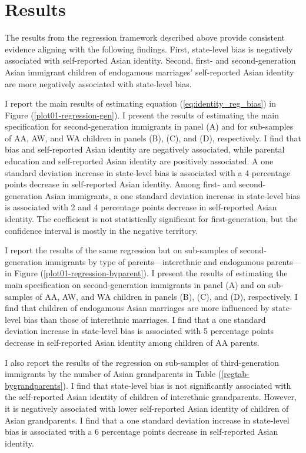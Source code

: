 \section{Results}\label{sec:results}
The results from the regression framework described above provide consistent evidence aligning with the following findings. First, state-level bias is negatively associated with self-reported Asian identity. Second, first- and second-generation Asian immigrant children of endogamous marriages' self-reported Asian identity are more negatively associated with state-level bias. 

I report the main results of estimating equation (\ref{eq:identity_reg_bias}) in Figure (\ref{plot01-regression-gen}). I present the results of estimating the main specification for second-generation immigrants in panel (A) and for sub-samples of AA, AW, and WA children in panels (B), (C), and (D), respectively. I find that bias and self-reported Asian identity are negatively associated, while parental education and self-reported Asian identity are positively associated. A one standard deviation increase in state-level bias is associated with a 4 percentage points decrease in self-reported Asian identity. Among first- and second-generation Asian immigrants, a one standard deviation increase in state-level bias is associated with 2 and 4 percentage points decrease in self-reported Asian identity. The coefficient is not statistically significant for first-generation, but the confidence interval is mostly in the negative territory.

I report the results of the same regression but on sub-samples of second-generation immigrants by type of parents---interethnic and endogamous parents---in Figure (\ref{plot01-regression-byparent}). I present the results of estimating the main specification on second-generation immigrants in panel (A) and on sub-samples of AA, AW, and WA children in panels (B), (C), and (D), respectively. I find that children of endogamous Asian marriages are more influenced by state-level bias than those of interethnic marriages. I find that a one standard deviation increase in state-level bias is associated with 5 percentage points decrease in self-reported Asian identity among children of AA parents. 

I also report the results of the regression on sub-samples of third-generation immigrants by the number of Asian grandparents in Table (\ref{regtab-bygrandparents}). I find that state-level bias is not significantly associated with the self-reported Asian identity of children of interethnic grandparents. However, it is negatively associated with lower self-reported Asian identity of children of Asian grandparents. I find that a one standard deviation increase in state-level bias is associated with a 6 percentage points decrease in self-reported Asian identity.

